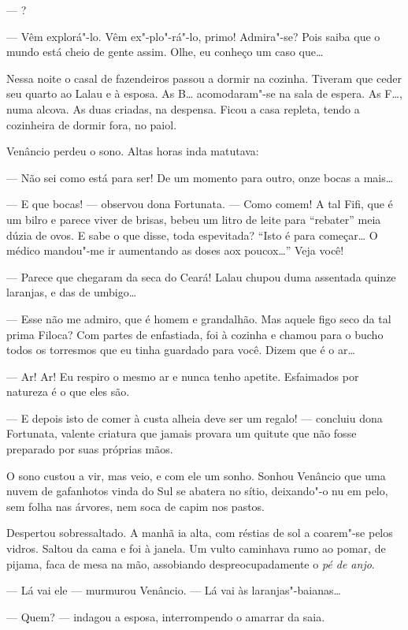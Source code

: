 --- ?

--- Vêm explorá"-lo. Vêm ex"-plo"-rá"-lo, primo! Admira"-se? Pois saiba que o
mundo está cheio de gente assim. Olhe, eu conheço um caso que\ldots{}

Nessa noite o casal de fazendeiros passou a dormir na cozinha. Tiveram
que ceder seu quarto ao Lalau e à esposa. As B\ldots{} acomodaram"-se na sala
de espera. As F\ldots{}, numa alcova. As duas criadas, na despensa. Ficou a
casa repleta, tendo a cozinheira de dormir fora, no paiol.

Venâncio perdeu o sono. Altas horas inda matutava:

--- Não sei como está para ser! De um momento para outro, onze bocas a
mais\ldots{}

--- E que bocas! --- observou dona Fortunata. --- Como comem! A tal
Fifi, que é um bilro e parece viver de brisas, bebeu um litro de leite
para ``rebater'' meia dúzia de ovos. E sabe o que disse, toda
espevitada? ``Isto é para começar\ldots{} O médico mandou"-me ir aumentando as
doses aox poucox\ldots{}'' Veja você!

--- Parece que chegaram da seca do Ceará! Lalau chupou duma assentada
quinze laranjas, e das de umbigo\ldots{}

--- Esse não me admiro, que é homem e grandalhão. Mas aquele figo seco
da tal prima Filoca? Com partes de enfastiada, foi à cozinha e chamou
para o bucho todos os torresmos que eu tinha guardado para você. Dizem
que é o ar\ldots{}

--- Ar! Ar! Eu respiro o mesmo ar e nunca tenho apetite. Esfaimados por
natureza é o que eles são.

--- E depois isto de comer à custa alheia deve ser um regalo! ---
concluiu dona Fortunata, valente criatura que jamais provara um quitute
que não fosse preparado por suas próprias mãos.

O sono custou a vir, mas veio, e com ele um sonho. Sonhou Venâncio que
uma nuvem de gafanhotos vinda do Sul se abatera no sítio, deixando"-o nu
em pelo, sem folha nas árvores, nem soca de capim nos pastos.

Despertou sobressaltado. A manhã ia alta, com réstias de sol a coarem"-se
pelos vidros. Saltou da cama e foi à janela. Um vulto caminhava rumo ao
pomar, de pijama, faca de mesa na mão, assobiando despreocupadamente o
\emph{pé de anjo}.

--- Lá vai ele --- murmurou Venâncio. --- Lá vai às laranjas"-baianas\ldots{}

--- Quem? --- indagou a esposa, interrompendo o amarrar da saia.


